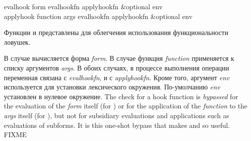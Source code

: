 \begin{defun}[Function]
evalhook form evalhookfn applyhookfn &optional env \\
applyhook function args evalhookfn applyhookfn &optional env

Функции  и  представлены для облегчения
использования функциональности ловушек.

В случае  вычисляется форма \emph{form}.
В случае  функция \emph{function} применяется к списку аргументов
\emph{args}.
В обоих случаях, в процессе выполнения операции переменная 
связана с \emph{evalhookfn}, и  с \emph{applyhookfn}.
Кроме того, аргумент \emph{env} используется для установки лексического
окружения.
По-умолчанию \emph{env} установлен в нулевое окружение.
The check for a hook function is \emph{bypassed} for the evaluation
of the \emph{form} itself (for ) or for the application
of the \emph{function} to the \emph{args} itself (for ),
but not for subsidiary evaluations and applications
such as evaluations of subforms.  It is this one-shot bypass that makes
 and  so useful. FIXME


\end{defun}
